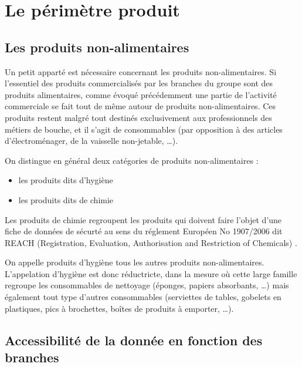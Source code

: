     \chapter{Le périmètre produit}
    \label{perimetre_produit}

    \section{Les produits non-alimentaires}
    \label{produits_nonal}
    Un petit apparté est nécessaire concernant les produits non-alimentaires.
    Si l'essentiel des produits commercialisés par les branches du groupe sont des produits alimentaires, comme évoqué précédemment une partie de l'activité commerciale se fait tout de même autour de produits non-alimentaires.
    Ces produits restent malgré tout destinés exclusivement aux professionnels des métiers de bouche, et il s'agit de consommables (par opposition à des articles d'électroménager, de la vaisselle non-jetable, \dots).

    On distingue en général deux catégories de produits non-alimentaires : 
    \begin{itemize}
        \item les produits dits \og d'hygiène \fg
        \item les produits dits \og de chimie \fg
    \end{itemize}

    Les produits de chimie regroupent les produits qui doivent faire l'objet d'une fiche de données de sécurté au sens du réglement Européen No 1907/2006 dit \og REACH \fg (Registration, Evaluation, Authorisation and Restriction of Chemicals) \cite{reach_text}.

    On appelle produits d'hygiène tous les autres produits non-alimentaires.
    L'appelation \og d'hygiène \fg est donc réductricte, dans la mesure où cette large famille regroupe les consommables de nettoyage (éponges, papiers absorbants, \dots) mais également tout type d'autres consommables (serviettes de tables, gobelets en plastiques, pics à brochettes, boîtes de produits à emporter, \dots).


        \section{Accessibilité de la donnée en fonction des branches}

